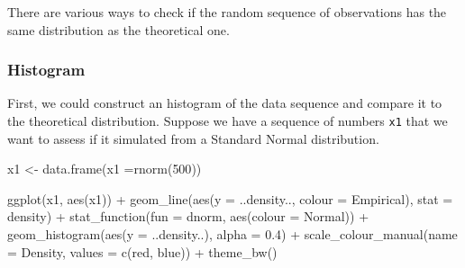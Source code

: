 \documentclass[
]{book}
\newenvironment{Shaded}{\begin{snugshade}}{\end{snugshade}}
\newcommand{\AttributeTok}[1]{\textcolor[rgb]{0.77,0.63,0.00}{#1}}
\newcommand{\DecValTok}[1]{\textcolor[rgb]{0.00,0.00,0.81}{#1}}
\newcommand{\FloatTok}[1]{\textcolor[rgb]{0.00,0.00,0.81}{#1}}
\newcommand{\FunctionTok}[1]{\textcolor[rgb]{0.00,0.00,0.00}{#1}}
\newcommand{\NormalTok}[1]{#1}
\newcommand{\OtherTok}[1]{\textcolor[rgb]{0.56,0.35,0.01}{#1}}
\newcommand{\SpecialCharTok}[1]{\textcolor[rgb]{0.00,0.00,0.00}{#1}}
\newcommand{\StringTok}[1]{\textcolor[rgb]{0.31,0.60,0.02}{#1}}
\theoremstyle{definition}
\theoremstyle{definition}
\theoremstyle{definition}
\theoremstyle{definition}
\theoremstyle{remark}
\begin{document}
There are various ways to check if the random sequence of observations has the same distribution as the theoretical one.

\hypertarget{histogram}{%
\subsubsection{Histogram}\label{histogram}}

First, we could construct an histogram of the data sequence and compare it to the theoretical distribution. Suppose we have a sequence of numbers \texttt{x1} that we want to assess if it simulated from a Standard Normal distribution.

\begin{Shaded}
\begin{Highlighting}[]
\NormalTok{x1 }\OtherTok{\textless{}{-}} \FunctionTok{data.frame}\NormalTok{(}\AttributeTok{x1 =}\FunctionTok{rnorm}\NormalTok{(}\DecValTok{500}\NormalTok{))}
\end{Highlighting}
\end{Shaded}

\begin{Shaded}
\begin{Highlighting}[]
\FunctionTok{ggplot}\NormalTok{(x1, }\FunctionTok{aes}\NormalTok{(x1)) }\SpecialCharTok{+}
   \FunctionTok{geom\_line}\NormalTok{(}\FunctionTok{aes}\NormalTok{(}\AttributeTok{y =}\NormalTok{ ..density.., }\AttributeTok{colour =} \StringTok{\textquotesingle{}Empirical\textquotesingle{}}\NormalTok{), }\AttributeTok{stat =} \StringTok{\textquotesingle{}density\textquotesingle{}}\NormalTok{) }\SpecialCharTok{+}
   \FunctionTok{stat\_function}\NormalTok{(}\AttributeTok{fun =}\NormalTok{ dnorm, }\FunctionTok{aes}\NormalTok{(}\AttributeTok{colour =} \StringTok{\textquotesingle{}Normal\textquotesingle{}}\NormalTok{)) }\SpecialCharTok{+}      
   \FunctionTok{geom\_histogram}\NormalTok{(}\FunctionTok{aes}\NormalTok{(}\AttributeTok{y =}\NormalTok{ ..density..), }\AttributeTok{alpha =} \FloatTok{0.4}\NormalTok{) }\SpecialCharTok{+}      
   \FunctionTok{scale\_colour\_manual}\NormalTok{(}\AttributeTok{name =} \StringTok{\textquotesingle{}Density\textquotesingle{}}\NormalTok{, }\AttributeTok{values =} \FunctionTok{c}\NormalTok{(}\StringTok{\textquotesingle{}red\textquotesingle{}}\NormalTok{, }\StringTok{\textquotesingle{}blue\textquotesingle{}}\NormalTok{)) }\SpecialCharTok{+}
   \FunctionTok{theme\_bw}\NormalTok{()}
\end{Highlighting}
\end{Shaded}
\end{document}

